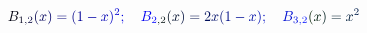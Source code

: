 \documentclass[12pt]{article}
\begin{document}
\makeatletter
\renewcommand*{\@textcolor}[3]{%
  \protect\leavevmode
  \begingroup
    \color#1{#2}#3%
  \endgroup
}
\makeatother
\begin{displaymath}
\mathcolor[RGB]{0,0,15}{B} _ { \mathcolor[RGB]{0,0,30}{1} \mathcolor[RGB]{0,0,45}{,} \mathcolor[RGB]{0,0,60}{2} } \mathcolor[RGB]{0,0,75}{(} \mathcolor[RGB]{0,0,90}{x} \mathcolor[RGB]{0,0,105}{)} \mathcolor[RGB]{0,0,120}{=} \mathcolor[RGB]{0,0,135}{(} \mathcolor[RGB]{0,0,150}{1} \mathcolor[RGB]{0,0,165}{-} \mathcolor[RGB]{0,0,180}{x} \mathcolor[RGB]{0,0,195}{)} ^ { \mathcolor[RGB]{0,0,210}{2} } \mathcolor[RGB]{0,0,225}{;} \quad \mathcolor[RGB]{0,0,240}{B} _ { \mathcolor[RGB]{0,0,255}{2} \mathcolor[RGB]{0,15,0}{,} \mathcolor[RGB]{0,15,15}{2} } \mathcolor[RGB]{0,15,30}{(} \mathcolor[RGB]{0,15,45}{x} \mathcolor[RGB]{0,15,60}{)} \mathcolor[RGB]{0,15,75}{=} \mathcolor[RGB]{0,15,90}{2} \mathcolor[RGB]{0,15,105}{x} \mathcolor[RGB]{0,15,120}{(} \mathcolor[RGB]{0,15,135}{1} \mathcolor[RGB]{0,15,150}{-} \mathcolor[RGB]{0,15,165}{x} \mathcolor[RGB]{0,15,180}{)} \mathcolor[RGB]{0,15,195}{;} \quad \mathcolor[RGB]{0,15,210}{B} _ { \mathcolor[RGB]{0,15,225}{3} \mathcolor[RGB]{0,15,240}{,} \mathcolor[RGB]{0,15,255}{2} } \mathcolor[RGB]{0,30,0}{(} \mathcolor[RGB]{0,30,15}{x} \mathcolor[RGB]{0,30,30}{)} \mathcolor[RGB]{0,30,45}{=} \mathcolor[RGB]{0,30,60}{x} ^ { \mathcolor[RGB]{0,30,75}{2} }
\end{displaymath}
\end{document}

